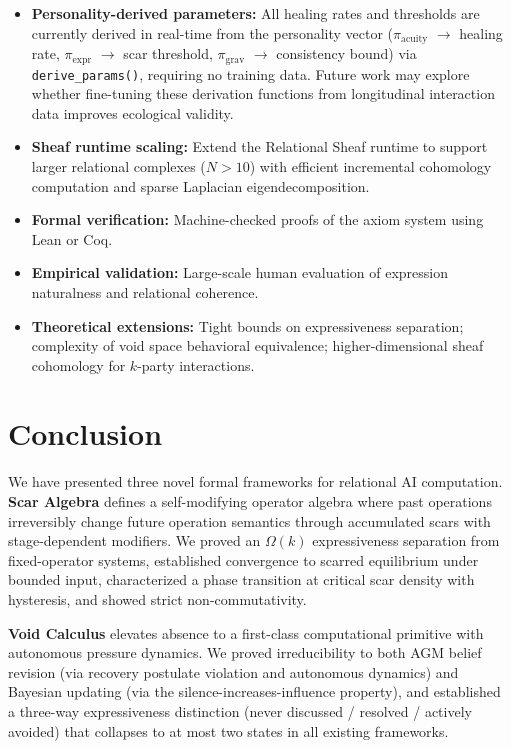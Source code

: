 \documentclass[11pt]{article}
\begin{document}
\begin{itemize}
\item \textbf{Personality-derived parameters:} All healing rates and thresholds are currently derived in real-time from the personality vector ($\pi_{\text{acuity}}$ $\to$ healing rate, $\pi_{\text{expr}}$ $\to$ scar threshold, $\pi_{\text{grav}}$ $\to$ consistency bound) via \texttt{derive\_params()}, requiring no training data. Future work may explore whether fine-tuning these derivation functions from longitudinal interaction data improves ecological validity.
\item \textbf{Sheaf runtime scaling:} Extend the Relational Sheaf runtime to support larger relational complexes ($N > 10$) with efficient incremental cohomology computation and sparse Laplacian eigendecomposition.
\item \textbf{Formal verification:} Machine-checked proofs of the axiom system using Lean or Coq.
\item \textbf{Empirical validation:} Large-scale human evaluation of expression naturalness and relational coherence.
\item \textbf{Theoretical extensions:} Tight bounds on expressiveness separation; complexity of void space behavioral equivalence; higher-dimensional sheaf cohomology for $k$-party interactions.
\end{itemize}

\section{Conclusion}
\label{sec:conclusion}

We have presented three novel formal frameworks for relational AI computation. \textbf{Scar Algebra} defines a self-modifying operator algebra where past operations irreversibly change future operation semantics through accumulated scars with stage-dependent modifiers. We proved an $\Omega(k)$ expressiveness separation from fixed-operator systems, established convergence to scarred equilibrium under bounded input, characterized a phase transition at critical scar density with hysteresis, and showed strict non-commutativity.

\textbf{Void Calculus} elevates absence to a first-class computational primitive with autonomous pressure dynamics. We proved irreducibility to both AGM belief revision (via recovery postulate violation and autonomous dynamics) and Bayesian updating (via the silence-increases-influence property), and established a three-way expressiveness distinction (never discussed / resolved / actively avoided) that collapses to at most two states in all existing frameworks.
\end{document}
